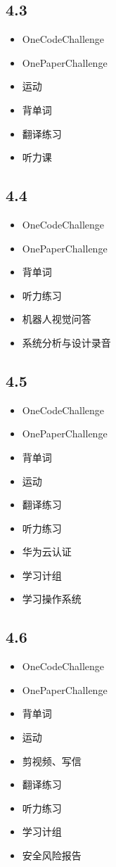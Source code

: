 \documentclass[UTF8]{ctexart}
\begin{document}
\subsection*{4.3}
\begin{itemize}
    \item OneCodeChallenge
    \item OnePaperChallenge
    \item 运动
    \item 背单词
    \item 翻译练习
    \item 听力课
\end{itemize}

\subsection*{4.4}
\begin{itemize}
    \item OneCodeChallenge
    \item OnePaperChallenge
    \item 背单词
    \item 听力练习
    \item 机器人视觉问答
    \item 系统分析与设计录音
\end{itemize}

\subsection*{4.5}
\begin{itemize}
    \item OneCodeChallenge
    \item OnePaperChallenge
    \item 背单词
    \item 运动
    \item 翻译练习
    \item 听力练习
    \item 华为云认证
    \item 学习计组
    \item 学习操作系统
\end{itemize}

\subsection*{4.6}
\begin{itemize}
    \item OneCodeChallenge
    \item OnePaperChallenge
    \item 背单词
    \item 运动
    \item 剪视频、写信
    \item 翻译练习
    \item 听力练习
    \item 学习计组
    \item 安全风险报告
\end{itemize}
\end{document}
